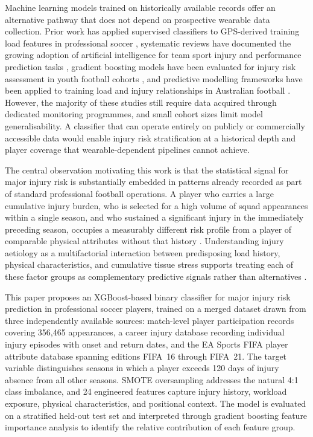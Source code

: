 \documentclass[conference]{IEEEtran}
\begin{document}
Machine learning models trained on historically available records offer an alternative pathway that does not depend on prospective wearable data collection. Prior work has applied supervised classifiers to GPS-derived training load features in professional soccer \cite{rossi2018effective}, systematic reviews have documented the growing adoption of artificial intelligence for team sport injury and performance prediction tasks \cite{claudino2019current}, gradient boosting models have been evaluated for injury risk assessment in youth football cohorts \cite{rommers2020machine}, and predictive modelling frameworks have been applied to training load and injury relationships in Australian football \cite{carey2018predictive}. However, the majority of these studies still require data acquired through dedicated monitoring programmes, and small cohort sizes limit model generalisability. A classifier that can operate entirely on publicly or commercially accessible data would enable injury risk stratification at a historical depth and player coverage that wearable-dependent pipelines cannot achieve.

The central observation motivating this work is that the statistical signal for major injury risk is substantially embedded in patterns already recorded as part of standard professional football operations. A player who carries a large cumulative injury burden, who is selected for a high volume of squad appearances within a single season, and who sustained a significant injury in the immediately preceding season, occupies a measurably different risk profile from a player of comparable physical attributes without that history \cite{hagglund2006previous}. Understanding injury aetiology as a multifactorial interaction between predisposing load history, physical characteristics, and cumulative tissue stress supports treating each of these factor groups as complementary predictive signals rather than alternatives \cite{bahr2005understanding}.

This paper proposes an XGBoost-based binary classifier for major injury risk prediction in professional soccer players, trained on a merged dataset drawn from three independently available sources: match-level player participation records covering 356,465 appearances, a career injury database recording individual injury episodes with onset and return dates, and the EA Sports FIFA player attribute database spanning editions FIFA~16 through FIFA~21. The target variable distinguishes seasons in which a player exceeds 120 days of injury absence from all other seasons. SMOTE oversampling \cite{chawla2002smote} addresses the natural 4:1 class imbalance, and 24 engineered features capture injury history, workload exposure, physical characteristics, and positional context. The model is evaluated on a stratified held-out test set and interpreted through gradient boosting feature importance analysis to identify the relative contribution of each feature group.
\end{document}
